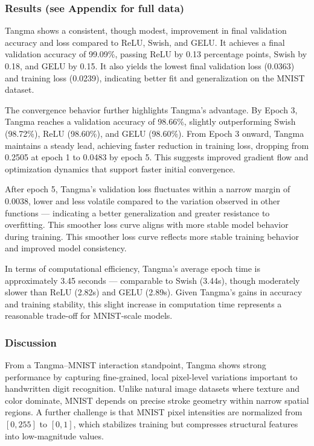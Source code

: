 \documentclass{article}
\begin{document}
\subsubsection{Results (see Appendix for full data)}
Tangma shows a consistent, though modest, improvement in final validation accuracy and loss compared to ReLU, Swish, and GELU. It achieves a final validation accuracy of 99.09\%, passing ReLU by 0.13 percentage points, Swish by 0.18, and GELU by 0.15. It also yields the lowest final validation loss (0.0363) and training loss (0.0239), indicating better fit and generalization on the MNIST dataset.

\vspace{4pt}
\noindent
The convergence behavior further highlights Tangma's advantage. By Epoch 3, Tangma reaches a validation accuracy of 98.66\%, slightly outperforming Swish (98.72\%), ReLU (98.60\%), and GELU (98.60\%). From Epoch 3 onward, Tangma maintains a steady lead, achieving faster reduction in training loss, dropping from 0.2505 at epoch 1 to 0.0483 by epoch 5. This suggests improved gradient flow and optimization dynamics that support faster initial convergence. 

\vspace{4pt}
\noindent
After epoch 5, Tangma's validation loss fluctuates within a narrow margin of 0.0038, lower and less volatile compared to the variation observed in other functions --- indicating a better generalization and greater resistance to overfitting. This smoother loss curve aligns with more stable model behavior during training. This smoother loss curve reflects more stable training behavior and improved model consistency. 

\vspace{4pt}
\noindent
In terms of computational efficiency, Tangma's average epoch time is approximately 3.45 seconds --- comparable to Swish (3.44s), though moderately slower than ReLU (2.82s) and GELU (2.89s). Given Tangma's gains in accuracy and training stability, this slight increase in computation time represents a reasonable trade-off for MNIST-scale models. 

\vspace{4pt}
\noindent

\subsubsection{Discussion}
From a Tangma--MNIST interaction standpoint, Tangma shows strong performance by capturing fine-grained, local pixel-level variations important to handwritten digit recognition. Unlike natural image datasets where texture and color dominate, MNIST depends on precise stroke geometry within narrow spatial regions. A further challenge is that MNIST pixel intensities are normalized from $[0, 255]$ to $[0, 1]$, which stabilizes training but compresses structural features into low-magnitude values. 
\end{document}
